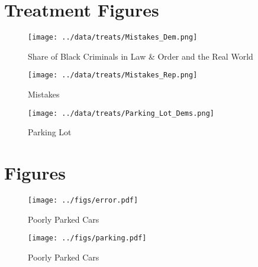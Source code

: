 \documentclass[12pt, letterpaper]{article}
\begin{document}
\section{Treatment Figures}
\begin{figure}[!htbp]
\centering
\caption{Share of Black Criminals in Law \& Order and the Real World}
\texttt{[image: ../data/treats/Mistakes\_Dem.png]}
\label{fig:mistakes_dem}
\end{figure}

\begin{figure}[!htbp]
\centering
\caption{Mistakes}
\texttt{[image: ../data/treats/Mistakes\_Rep.png]}
\label{fig:mistakes_rep}
\end{figure}

\begin{figure}[!htbp]
\centering
\caption{Parking Lot}
\texttt{[image: ../data/treats/Parking\_Lot\_Dems.png]}
\label{fig:mistakes_rep}
\end{figure}

\clearpage
\section{Figures}

\begin{figure}[!htbp]
\centering
\caption{Poorly Parked Cars}
\texttt{[image: ../figs/error.pdf]}
\label{fig:mistakes_rep}
\end{figure}


\begin{figure}[!htbp]
\centering
\caption{Poorly Parked Cars}
\texttt{[image: ../figs/parking.pdf]}
\label{fig:mistakes_rep}
\end{figure}
\end{document}
